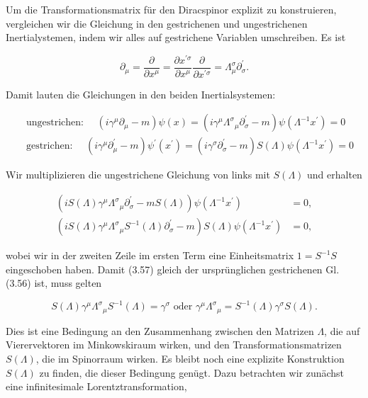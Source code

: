 \documentclass[10pt, letterpaper]{article}
\begin{document}
Um die Transformationsmatrix für den Diracspinor explizit zu konstruieren, vergleichen wir die Gleichung in den gestrichenen und ungestrichenen Inertialystemen, indem wir alles auf gestrichene Variablen umschreiben. Es ist

$$
\partial_{\mu}=\frac{\partial}{\partial x^{\mu}}=\frac{\partial x^{\prime \sigma}}{\partial x^{\mu}} \frac{\partial}{\partial x^{\prime \sigma}}=\Lambda_{\mu}^{\sigma} \partial_{\sigma}^{\prime} .
$$

Damit lauten die Gleichungen in den beiden Inertialsystemen:

$$
\begin{aligned}
& \text { ungestrichen: } \quad\left(i \gamma^{\mu} \partial_{\mu}-m\right) \psi(x)=\left(i \gamma^{\mu} \Lambda^{\sigma}{ }_{\mu} \partial_{\sigma}^{\prime}-m\right) \psi\left(\Lambda^{-1} x^{\prime}\right)=0 \\
& \text { gestrichen: } \quad\left(i \gamma^{\mu} \partial_{\mu}^{\prime}-m\right) \psi^{\prime}\left(x^{\prime}\right)=\left(i \gamma^{\sigma} \partial_{\sigma}^{\prime}-m\right) S(\Lambda) \psi\left(\Lambda^{-1} x^{\prime}\right)=0
\end{aligned}
$$

Wir multiplizieren die ungestrichene Gleichung von links mit $S(\Lambda)$ und erhalten

$$
\begin{aligned}
\left(i S(\Lambda) \gamma^{\mu} \Lambda^{\sigma}{ }_{\mu} \partial_{\sigma}^{\prime}-m S(\Lambda)\right) \psi\left(\Lambda^{-1} x^{\prime}\right) & =0, \\
\left(i S(\Lambda) \gamma^{\mu} \Lambda^{\sigma}{ }_{\mu} S^{-1}(\Lambda) \partial_{\sigma}^{\prime}-m\right) S(\Lambda) \psi\left(\Lambda^{-1} x^{\prime}\right) & =0,
\end{aligned}
$$

wobei wir in der zweiten Zeile im ersten Term eine Einheitsmatrix $1=S^{-1} S$ eingeschoben haben. Damit (3.57) gleich der ursprünglichen gestrichenen Gl. (3.56) ist, muss gelten

$$
S(\Lambda) \gamma^{\mu} \Lambda^{\sigma}{ }_{\mu} S^{-1}(\Lambda)=\gamma^{\sigma} \text { oder } \gamma^{\mu} \Lambda^{\sigma}{ }_{\mu}=S^{-1}(\Lambda) \gamma^{\sigma} S(\Lambda) .
$$

Dies ist eine Bedingung an den Zusammenhang zwischen den Matrizen $\Lambda$, die auf Vierervektoren im Minkowskiraum wirken, und den Transformationsmatrizen $S(\Lambda)$, die im Spinorraum wirken. Es bleibt noch eine explizite Konstruktion $S(\Lambda)$ zu finden, die dieser Bedingung genügt. Dazu betrachten wir zunächst eine infinitesimale Lorentztransformation,
\end{document}
